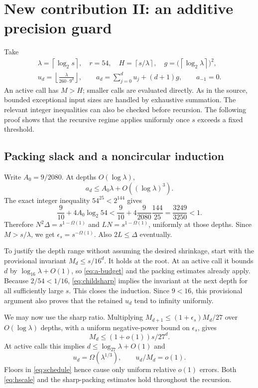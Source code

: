 \documentclass[11pt,letterpaper]{article}
\theoremstyle{definition}\newtheorem{definition}[theorem]{Definition}
\theoremstyle{remark}\newtheorem{remark}[theorem]{Remark}
\newcommand{\ceil}[1]{\left\lceil#1\right\rceil}
\newcommand{\floor}[1]{\left\lfloor#1\right\rfloor}
\begin{document}
\section{New contribution II: an additive precision guard}\label{sec:schedule}
Take
\begin{equation}\label{eq:schedule}
 \begin{gathered}
 \lambda=\ceil{\log_2s},\quad r=54,\quad
 H=\ceil{s/\lambda},\quad
 g=\bigl(\ceil{\log_2\lambda}\bigr)^2,\\
 u_d=\floor{\frac{\lambda}{260\cdot9^d}},\qquad
 a_d=\sum_{j=0}^d u_j+(d+1)g,
 \qquad a_{-1}=0.
 \end{gathered}
\end{equation}
An active call has $M>H$; smaller calls are evaluated directly.
As in the source, bounded exceptional input sizes are handled by exhaustive
summation. The relevant integer inequalities can also be checked before
recursion. The following proof shows that the recursive regime applies
uniformly once $s$ exceeds a fixed threshold.

\subsection{Packing slack and a noncircular induction}
Write $A_0=9/2080$. At depths $O(\log\lambda)$,
\begin{equation}\label{eq:a-budget}
 a_d\le A_0\lambda+O((\log\lambda)^3).
\end{equation}
The exact integer inequality $54^{25}<2^{144}$ gives
\begin{equation}\label{eq:powergap}
 \frac9{10}+4A_0\log_2 54
 <\frac9{10}+4\frac9{2080}\frac{144}{25}
 =\frac{3249}{3250}<1.
\end{equation}
Therefore $N^2\Delta=s^{1-\Omega(1)}$ and $LN=s^{1-\Omega(1)}$,
uniformly at those depths. Since $M>s/\lambda$, we get
$\epsilon_s=s^{-\Omega(1)}$. Also $2L\le\Delta$ eventually.

To justify the depth range without assuming the desired shrinkage, start
with the provisional invariant $M_d\le s/16^d$. It holds at the root.
At an active call it bounds $d$ by $\log_{16}\lambda+O(1)$, so
\eqref{eq:a-budget} and the packing estimates already apply. Because
$2/54<1/16$, \eqref{eq:childsharp} implies the invariant at the next
depth for all sufficiently large $s$. This closes the induction.
Since $9<16$, this provisional argument also proves that the retained
$u_d$ tend to infinity uniformly.

We may now use the sharp ratio. Multiplying
$M_{d+1}\le(1+\epsilon_s)M_d/27$ over $O(\log\lambda)$ depths,
with a uniform negative-power bound on $\epsilon_s$, gives
\begin{equation}\label{eq:sharppath}
 M_d\le(1+o(1))s/27^d.
\end{equation}
At active calls this implies
$d\le\log_{27}\lambda+O(1)$ and
\begin{equation}\label{eq:ulower}
 u_d=\Omega(\lambda^{1/3}),\qquad u_d/M_d=o(1).
\end{equation}
Floors in \eqref{eq:schedule} hence cause only uniform relative $o(1)$
errors. Both \eqref{eq:hscale} and the sharp-packing estimates hold
throughout the recursion.
\end{document}
